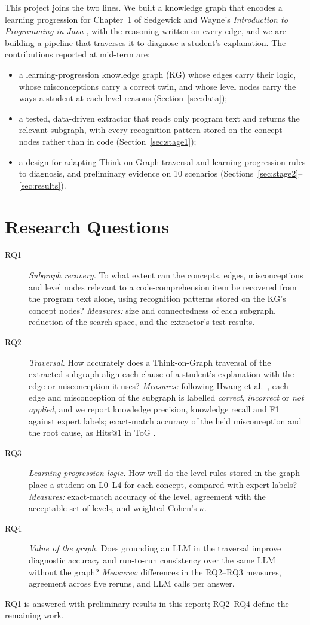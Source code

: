\documentclass[sigconf,nonacm]{acmart}
\begin{document}
This project joins the two lines. We built a knowledge graph that encodes a learning progression for
Chapter~1 of Sedgewick and Wayne's \emph{Introduction to Programming in Java} \cite{sedgewick2017java}, with the
reasoning written on every edge, and we are building a pipeline that traverses it to diagnose a student's
explanation. The contributions reported at mid-term are:
\begin{itemize}
\item a learning-progression knowledge graph (KG) whose edges carry their logic, whose misconceptions carry a
correct twin, and whose level nodes carry the ways a student at each level reasons (Section~\ref{sec:data});
\item a tested, data-driven extractor that reads only program text and returns the relevant subgraph, with every
recognition pattern stored on the concept nodes rather than in code (Section~\ref{sec:stage1});
\item a design for adapting Think-on-Graph traversal and learning-progression rules to diagnosis, and preliminary
evidence on 10 scenarios (Sections~\ref{sec:stage2}--\ref{sec:results}).
\end{itemize}

\section{Research Questions}
\label{sec:rq}
\begin{description}
\item[RQ1] \emph{Subgraph recovery.} To what extent can the concepts, edges, misconceptions and level nodes
relevant to a code-comprehension item be recovered from the program text alone, using recognition patterns
stored on the KG's concept nodes? \emph{Measures:} size and connectedness of each subgraph, reduction of the
search space, and the extractor's test results.
\item[RQ2] \emph{Traversal.} How accurately does a Think-on-Graph traversal of the extracted subgraph align
each clause of a student's explanation with the edge or misconception it uses? \emph{Measures:} following
Hwang et al.\ \cite{hwang2025principal}, each edge and misconception of the subgraph is labelled \emph{correct},
\emph{incorrect} or \emph{not applied}, and we report knowledge precision, knowledge recall and F1 against expert
labels; exact-match accuracy of the held misconception and the root cause, as Hits@1 in ToG \cite{sun2024tog}.
\item[RQ3] \emph{Learning-progression logic.} How well do the level rules stored in the graph place a student
on L0--L4 for each concept, compared with expert labels? \emph{Measures:} exact-match accuracy of the level,
agreement with the acceptable set of levels, and weighted Cohen's $\kappa$.
\item[RQ4] \emph{Value of the graph.} Does grounding an LLM in the traversal improve diagnostic accuracy and
run-to-run consistency over the same LLM without the graph? \emph{Measures:} differences in the RQ2--RQ3 measures,
agreement across five reruns, and LLM calls per answer.
\end{description}
RQ1 is answered with preliminary results in this report; RQ2--RQ4 define the remaining work.
\end{document}
